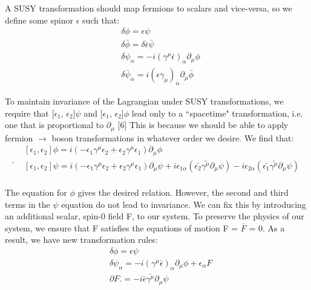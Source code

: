 \documentclass{article}
\begin{document}
\par
A SUSY transformation should map fermions to scalars and vice-versa, so we define some spinor $\epsilon$ such that:
\begin{equation} \label{eq:8}
    \begin{aligned}
    & \delta{\phi} = \epsilon{\psi} \\
    & \delta{\bar{\phi}} = \delta{\bar{\epsilon}}\bar{\psi} \\
    & \delta{\psi_{\alpha}} = -i(\gamma^{\mu}\bar{\epsilon})_{\alpha}\partial_{\mu}\phi \\
    & \delta{\bar{\psi}_{\dot{\alpha}}} = i(\epsilon{\gamma_{\mu}})_{\dot{\alpha}}\partial_{\mu}\bar{\phi}
    \end{aligned}
\end{equation}
\par
To maintain invariance of the Lagrangian under SUSY transformations, we require that [$\epsilon_{1}$, $\epsilon_{2}$]$\psi$ and [$\epsilon_{1}$, $\epsilon_{2}$]$\phi$ lead only to a ``spacetime"  transformation, i.e. one that is proportional to $\partial_{\mu}$ [6] This is because we should be able to apply fermion $\rightarrow$ boson transformations in whatever order we desire. We find that:
\begin{equation}. \label{eq:9}
    \begin{aligned}
        & [\epsilon_{1}, \epsilon_{2}]\phi = i(-\epsilon_{1}\gamma^{\mu}\epsilon_{2} + \epsilon_{2}\gamma^{\mu}\epsilon_{1})\partial_{\mu}\phi \\
        & [\epsilon_{1}, \epsilon_{2}]\psi = i(-\epsilon_{1}\gamma^{\mu}\epsilon_{2} + \epsilon_{2}\gamma^{\mu}\epsilon_{1})\partial_{\mu}\psi + i\epsilon_{1\alpha}(\bar{\epsilon_{2}}\bar{\gamma^{\mu}}\partial_{\mu}\psi) - i\epsilon_{2\alpha}(\bar{\epsilon_{1}}\bar{\gamma^{\mu}}\partial_{\mu}\psi) \\
    \end{aligned}
\end{equation}
\par
The equation for $\phi$ gives the desired relation. However, the second and third terms in the $\psi$ equation do not lead to invariance. We can fix this by introducing an additional scalar, spin-0 field F, to our system. To preserve the physics of our system, we ensure that F satisfies the equations of motion F = $\bar{F}$ = 0. As a result, we have new transformation rules:
\begin{equation} \label{eq:10}
    \begin{aligned}
    & \delta{\phi} = \epsilon{\psi} \\
    & \delta{\psi_{\alpha}} = -i(\gamma^{\mu}\bar{\epsilon})_{\alpha}\partial_{\mu}\phi + \epsilon_{\alpha}F \\
    & \partial{F}. = -i\bar{\epsilon}\bar{\gamma^{\mu}}\partial_{\mu}\psi
    \end{aligned}
\end{equation}
\end{document}
